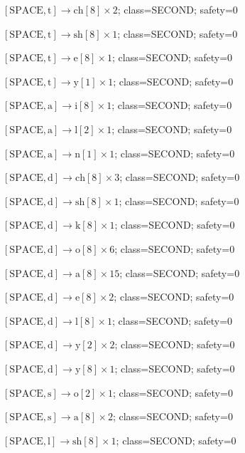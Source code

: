 \(\left[\mathrm{SPACE}, \mathrm{t}\right] \to \mathrm{ch}[8] \times 2\); class=SECOND; safety=0\par
\(\left[\mathrm{SPACE}, \mathrm{t}\right] \to \mathrm{sh}[8] \times 1\); class=SECOND; safety=0\par
\(\left[\mathrm{SPACE}, \mathrm{t}\right] \to \mathrm{e}[8] \times 1\); class=SECOND; safety=0\par
\(\left[\mathrm{SPACE}, \mathrm{t}\right] \to \mathrm{y}[1] \times 1\); class=SECOND; safety=0\par
\(\left[\mathrm{SPACE}, \mathrm{a}\right] \to \mathrm{i}[8] \times 1\); class=SECOND; safety=0\par
\(\left[\mathrm{SPACE}, \mathrm{a}\right] \to \mathrm{l}[2] \times 1\); class=SECOND; safety=0\par
\(\left[\mathrm{SPACE}, \mathrm{a}\right] \to \mathrm{n}[1] \times 1\); class=SECOND; safety=0\par
\(\left[\mathrm{SPACE}, \mathrm{d}\right] \to \mathrm{ch}[8] \times 3\); class=SECOND; safety=0\par
\(\left[\mathrm{SPACE}, \mathrm{d}\right] \to \mathrm{sh}[8] \times 1\); class=SECOND; safety=0\par
\(\left[\mathrm{SPACE}, \mathrm{d}\right] \to \mathrm{k}[8] \times 1\); class=SECOND; safety=0\par
\(\left[\mathrm{SPACE}, \mathrm{d}\right] \to \mathrm{o}[8] \times 6\); class=SECOND; safety=0\par
\(\left[\mathrm{SPACE}, \mathrm{d}\right] \to \mathrm{a}[8] \times 15\); class=SECOND; safety=0\par
\(\left[\mathrm{SPACE}, \mathrm{d}\right] \to \mathrm{e}[8] \times 2\); class=SECOND; safety=0\par
\(\left[\mathrm{SPACE}, \mathrm{d}\right] \to \mathrm{l}[8] \times 1\); class=SECOND; safety=0\par
\(\left[\mathrm{SPACE}, \mathrm{d}\right] \to \mathrm{y}[2] \times 2\); class=SECOND; safety=0\par
\(\left[\mathrm{SPACE}, \mathrm{d}\right] \to \mathrm{y}[8] \times 1\); class=SECOND; safety=0\par
\(\left[\mathrm{SPACE}, \mathrm{s}\right] \to \mathrm{o}[2] \times 1\); class=SECOND; safety=0\par
\(\left[\mathrm{SPACE}, \mathrm{s}\right] \to \mathrm{a}[8] \times 2\); class=SECOND; safety=0\par
\(\left[\mathrm{SPACE}, \mathrm{l}\right] \to \mathrm{sh}[8] \times 1\); class=SECOND; safety=0\par
